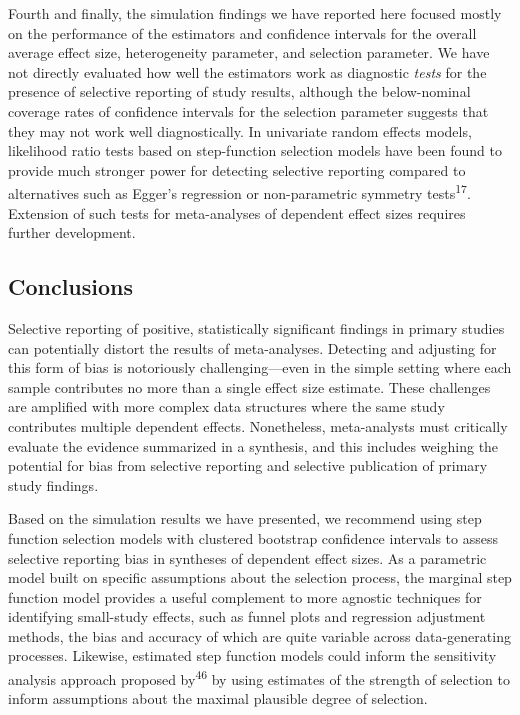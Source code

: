 \documentclass[
  american,
  man, donotrepeattitle,floatsintext]{apa7}
\begin{document}
Fourth and finally, the simulation findings we have reported here focused mostly on the performance of the estimators and confidence intervals for the overall average effect size, heterogeneity parameter, and selection parameter.
We have not directly evaluated how well the estimators work as diagnostic \emph{tests} for the presence of selective reporting of study results, although the below-nominal coverage rates of confidence intervals for the selection parameter suggests that they may not work well diagnostically.
In univariate random effects models, likelihood ratio tests based on step-function selection models have been found to provide much stronger power for detecting selective reporting compared to alternatives such as Egger's regression or non-parametric symmetry tests\textsuperscript{17}.
Extension of such tests for meta-analyses of dependent effect sizes requires further development.

\subsection{Conclusions}\label{conclusions}

Selective reporting of positive, statistically significant findings in primary studies can potentially distort the results of meta-analyses.
Detecting and adjusting for this form of bias is notoriously challenging---even in the simple setting where each sample contributes no more than a single effect size estimate.
These challenges are amplified with more complex data structures where the same study contributes multiple dependent effects.
Nonetheless, meta-analysts must critically evaluate the evidence summarized in a synthesis, and this includes weighing the potential for bias from selective reporting and selective publication of primary study findings.

Based on the simulation results we have presented, we recommend using step function selection models with clustered bootstrap confidence intervals to assess selective reporting bias in syntheses of dependent effect sizes. As a parametric model built on specific assumptions about the selection process, the marginal step function model provides a useful complement to more agnostic techniques for identifying small-study effects, such as funnel plots and regression adjustment methods, the bias and accuracy of which are quite variable across data-generating processes. Likewise, estimated step function models could inform the sensitivity analysis approach proposed by\textsuperscript{46} by using estimates of the strength of selection to inform assumptions about the maximal plausible degree of selection.
\end{document}
